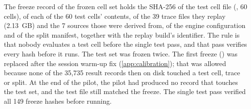 The freeze record of the frozen cell set holds the SHA-256 of the test cell file
(, 60 cells), of each of the 60 test cells' contents, of the 39 trace files
they replay (\SI{2.13}{GB}) and the 7 sources those were derived from, of the engine configuration
and of the split manifest, together with the replay build's identifier. The rule is that nobody
evaluates a test cell before the single test pass, and that pass verifies every hash before it
runs. %
The test set was frozen twice. The first freeze () was replaced after the
session warm-up fix (\cref{app:calibration}); that was allowed because none of the 35,735 result
records then on disk touched a test cell, trace or split. At the end of the pilot, the pilot had
produced no record that touches the test set, and the test file still matched the freeze. The
single test pass verified all 149 freeze hashes before running.
